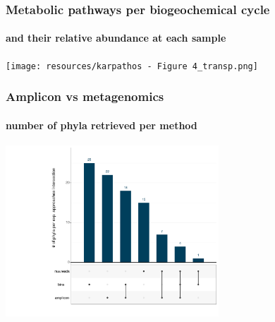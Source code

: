 \documentclass{beamer}
\begin{document}
   \begin{frame}
      \frametitle{Metabolic pathways per biogeochemical cycle}
      \framesubtitle{and their relative abundance at each sample}
      \centering
      \texttt{[image: resources/karpathos - Figure 4\_transp.png]}

   \end{frame}

   \begin{frame}
      \frametitle{Amplicon vs metagenomics}
      \framesubtitle{number of phyla retrieved per method}
      \includegraphics[width=80mm]{resources/upset.png}
   \end{frame}
\end{document}
